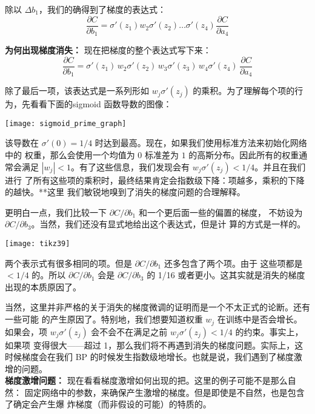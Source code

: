 除以 $\Delta b_1$，我们的确得到了梯度的表达式：
\begin{equation}
  \frac{\partial C}{\partial b_1} = \sigma'(z_1) w_2 \sigma'(z_2) \ldots
  \sigma'(z_4) \frac{\partial C}{\partial a_4}
\label{eq:121}\tag{121}
\end{equation}
 
\textbf{为何出现梯度消失：} 现在把梯度的整个表达式写下来：
\begin{equation}
  \frac{\partial C}{\partial b_1} = \sigma'(z_1) \, w_2 \sigma'(z_2) \, w_3
  \sigma'(z_3) \, w_4 \sigma'(z_4) \, \frac{\partial C}{\partial a_4}
  \label{eq:122}\tag{122}
\end{equation}
 
除了最后一项，该表达式是一系列形如 $w_j \sigma'(z_j)$ 的乘积。为了理解每个项的行
为，先看看下面的sigmoid 函数导数的图像：
\begin{center}
  \texttt{[image: sigmoid\_prime\_graph]}
\end{center}
 
该导数在 $\sigma'(0)=1/4$ 时达到最高。现在，如果我们使用标准方法来初始化网络中的
权重，那么会使用一个均值为 $0$ 标准差为 $1$ 的高斯分布。因此所有的权重通常会满足
$|w_j| < 1$。有了这些信息，我们发现会有 $w_j \sigma'(z_j) < 1/4$。并且在我们进行
了所有这些项的乘积时，最终结果肯定会指数级下降：项越多，乘积的下降的越快。**这里
我们敏锐地嗅到了消失的梯度问题的合理解释。
 
更明白一点，我们比较一下 $\partial C/\partial b_1$ 和一个更后面一些的偏置的梯度，
不妨设为 $\partial C/\partial b_3$。当然，我们还没有显式地给出这个表达式，但是计
算的方式是一样的。 
\begin{center}
  \texttt{[image: tikz39]}
\end{center}

两个表示式有很多相同的项。但是 $\partial C/\partial b_1$ 还多包含了两个项。由于
这些项都是 $< 1/4$ 的。所以 $\partial C/\partial b_1$ 会是 $\partial C/\partial
b_3$ 的 1/16 或者更小。这其实就是消失的梯度出现的本质原因了。

当然，这里并非严格的关于消失的梯度微调的证明而是一个不太正式的论断。还有一些可能
的产生原因了。特别地，我们想要知道权重 $w_j$ 在训练中是否会增长。如果会，项 $w_j
\sigma'(z_j)$ 会不会不在满足之前 $w_j \sigma'(z_j) < 1/4$ 的约束。事实上，如果项
变得很大——超过 1，那么我们将不再遇到消失的梯度问题。实际上，这时候梯度会在我们
BP 的时候发生指数级地增长。也就是说，我们遇到了梯度激增的问题。\\

\textbf{梯度激增问题：} 现在看看梯度激增如何出现的把。这里的例子可能不是那么自然：
固定网络中的参数，来确保产生激增的梯度。但是即使是不自然，也是包含了确定会产生爆
炸梯度（而非假设的可能）的特质的。
 
